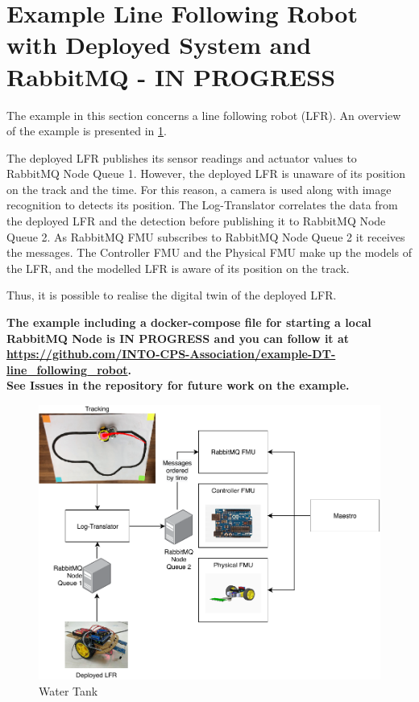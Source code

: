 \section{Example Line Following Robot with Deployed System and RabbitMQ - IN PROGRESS}\label{sec:example-lfr}
The example in this section concerns a line following robot (LFR). An overview
of the example is presented in \cref{fig:lfr-example-overview}.

The deployed LFR publishes its sensor readings and actuator values to RabbitMQ
Node Queue 1. However, the deployed LFR is unaware of its position on the
track and the time. For this reason, a camera is used along with image recognition to detects its position. The
Log-Translator correlates the data from the deployed LFR and the
detection before publishing it to RabbitMQ Node Queue 2. As RabbitMQ FMU subscribes
to RabbitMQ Node Queue 2 it receives the messages. The
Controller FMU and the Physical FMU make up the models of the LFR, and the
modelled LFR is aware of its position on the track.

Thus, it is possible to realise the digital twin of the deployed LFR.


\textbf{The example including a docker-compose file for
  starting a local RabbitMQ Node is IN PROGRESS and you can follow it at
  \url{https://github.com/INTO-CPS-Association/example-DT-line_following_robot}.\\
See Issues in the repository for future work on the example.}
\begin{figure}[!htb]
  \centering
  \includegraphics[width=\textwidth]{figures/lfr-example-overview.pdf}
  \caption{Water Tank}
  \label{fig:lfr-example-overview}
\end{figure}


